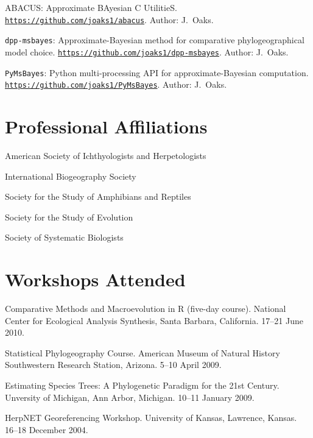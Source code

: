 \myHangIndent
ABACUS: Approximate BAyesian C UtilitieS.
\href{https://github.com/joaks1/abacus}{\tt https://github.com/joaks1/abacus}.
Author: J.\ Oaks.

\myHangIndent
\texttt{dpp-msbayes}: Approximate-Bayesian method for comparative
phylogeographical model choice.
\href{https://github.com/joaks1/dpp-msbayes}{\tt https://github.com/joaks1/dpp-msbayes}.
Author: J.\ Oaks.

\myHangIndent
\texttt{PyMsBayes}: Python multi-processing API for approximate-Bayesian computation.
\href{https://github.com/joaks1/PyMsBayes}{\tt https://github.com/joaks1/PyMsBayes}.
Author: J.\ Oaks.

\section*{Professional Affiliations}
\begin{myItemize}
\item American Society of Ichthyologists and Herpetologists
\item International Biogeography Society
\item Society for the Study of Amphibians and Reptiles
\item Society for the Study of Evolution
\item Society of Systematic Biologists
\end{myItemize}

\section*{Workshops Attended}
\myHangIndent
Comparative Methods and Macroevolution in R (five-day course).
National Center for Ecological Analysis Synthesis, Santa Barbara, California.
17--21 June 2010.

\myHangIndent
Statistical Phylogeography Course.
American Museum of Natural History Southwestern Research Station, Arizona.
5--10 April 2009.

\myHangIndent
Estimating Species Trees: A Phylogenetic Paradigm for the 21st Century.
Unversity of Michigan, Ann Arbor, Michigan.
10--11 January 2009.

\myHangIndent
HerpNET Georeferencing Workshop.
University of Kansas, Lawrence, Kansas.
16--18 December 2004.

